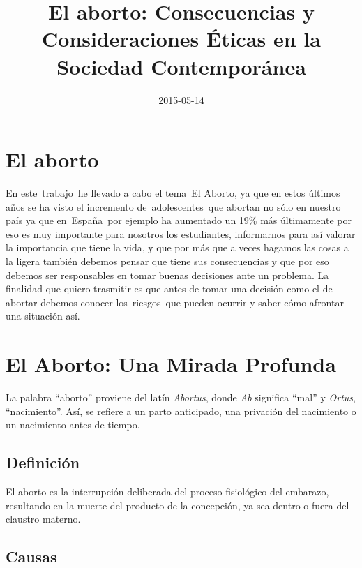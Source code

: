 \documentclass[
  jou,
  floatsintext,
  longtable,
  a4paper,
  nolmodern,
  notxfonts,
  notimes,
  colorlinks=true,linkcolor=blue,citecolor=blue,urlcolor=blue]{apa7}
\title{El aborto: Consecuencias y Consideraciones Éticas en la Sociedad
Contemporánea}
\date{2015-05-14}
\begin{document}
\maketitle

\hypertarget{toc}{}
\tableofcontents
\newpage
\section[Introduction]{El aborto}

\setcounter{secnumdepth}{-\maxdimen} %

\setlength\LTleft{0pt}


En este~trabajo~he llevado a cabo el tema~El Aborto, ya que en estos
últimos años se ha visto el incremento de~adolescentes~que abortan no
sólo en nuestro país ya que en~España~por ejemplo ha aumentado un 19\%
más últimamente por eso es muy importante para nosotros los estudiantes,
informarnos para así valorar la importancia que tiene la vida, y que por
más que a veces hagamos las cosas a la ligera también debemos pensar que
tiene sus consecuencias y que por eso debemos ser responsables en tomar
buenas decisiones ante un problema. La finalidad que quiero trasmitir es
que antes de tomar una decisión como el de abortar debemos conocer
los~riesgos~que pueden ocurrir y saber cómo afrontar una situación así.

\section{El Aborto: Una Mirada
Profunda}\label{el-aborto-una-mirada-profunda}

La palabra ``aborto'' proviene del latín \emph{Abortus}, donde \emph{Ab}
significa ``mal'' y \emph{Ortus}, ``nacimiento''. Así, se refiere a un
parto anticipado, una privación del nacimiento o un nacimiento antes de
tiempo.

\subsection{Definición}\label{definiciuxf3n}

El aborto es la interrupción deliberada del proceso fisiológico del
embarazo, resultando en la muerte del producto de la concepción, ya sea
dentro o fuera del claustro materno.

\subsection{Causas}\label{causas}
\end{document}
